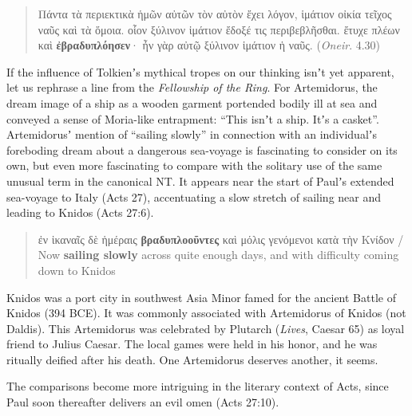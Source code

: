 \vspace*{3mm} 
 \begin{quote}Πάντα τὰ περιεκτικὰ ἡμῶν αὐτῶν τὸν αὐτὸν ἔχει %
 λόγον, ἱμάτιον οἰκία τεῖχος ναῦς καὶ τὰ ὅμοια. οἷον ξύλινον %
 ἱμάτιον ἔδοξέ τις περιβεβλῆσθαι. %
 ἔτυχε πλέων καὶ \textbf{ἐβραδυπλόησεν}· %
 ἦν γὰρ αὐτῷ ξύλινον ἱμάτιον ἡ ναῦς. (\textit{Oneir}. 4.30) \\[1mm]
 \end{quote} %
 \vspace*{3mm}

 If the influence of Tolkienʼs mythical tropes on our thinking isnʼt yet apparent, %
 let us rephrase a line from the \textit{Fellowship of the Ring}. %
 For Artemidorus, the dream image of %
 a ship as a wooden garment portended bodily ill at sea and conveyed a sense of Moria-like entrapment: %
 “This isnʼt a ship. Itʼs a casket”. %
Artemidorusʼ mention of “sailing slowly” in connection with an %
individualʼs foreboding dream about a dangerous sea-voyage is fascinating %
to consider on its own, but even more fascinating to compare with the solitary %
use of the same unusual term in the canonical NT. %
It appears near the start of Paulʼs extended sea-voyage to Italy (Acts 27), %
accentuating a slow stretch of sailing near and %
leading to Knidos (Acts 27:6).

\vspace*{3mm} 
 \begin{quote}ἐν ἱκαναῖς δὲ ἡμέραις \textbf{βραδυπλοοῦντες} καὶ μόλις γενόμενοι κατὰ τὴν Κνίδον / %
 Now \textbf{sailing slowly} across quite enough days, and with difficulty coming down to Knidos\end{quote} %
 \vspace*{3mm}

\noindent{}Knidos was a port city in southwest Asia Minor famed for the ancient Battle of Knidos (394 BCE). %
It was commonly associated with Artemidorus of Knidos (not Daldis). %
This Artemidorus was celebrated by Plutarch (\textit{Lives}, Caesar 65) as loyal friend to Julius Caesar. %
The local games were held in his honor, and he was ritually deified after his death. %
One Artemidorus deserves another, it seems. %

The comparisons become more intriguing in the literary context of Acts, %
since Paul soon thereafter delivers an evil omen (Acts 27:10). %

